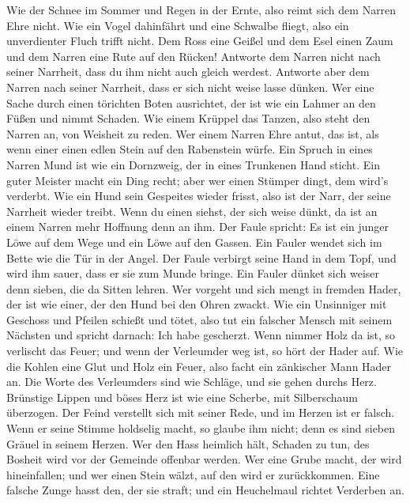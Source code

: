  Wie der Schnee im Sommer und Regen in der Ernte, also
reimt sich dem Narren Ehre nicht.  Wie ein Vogel
dahinfährt und eine Schwalbe fliegt, also ein unverdienter Fluch trifft
nicht.  Dem Ross eine Geißel und dem Esel einen Zaum und
dem Narren eine Rute auf den Rücken!  Antworte dem Narren
nicht nach seiner Narrheit, dass du ihm nicht auch gleich werdest.
 Antworte aber dem Narren nach seiner Narrheit, dass er
sich nicht weise lasse dünken.  Wer eine Sache durch einen
törichten Boten ausrichtet, der ist wie ein Lahmer an den Füßen und
nimmt Schaden.  Wie einem Krüppel das Tanzen, also steht
den Narren an, von Weisheit zu reden.  Wer einem Narren
Ehre antut, das ist, als wenn einer einen edlen Stein auf den Rabenstein
würfe.  Ein Spruch in eines Narren Mund ist wie ein
Dornzweig, der in eines Trunkenen Hand sticht.  Ein guter
Meister macht ein Ding recht; aber wer einen Stümper dingt, dem wird's
verderbt.  Wie ein Hund sein Gespeites wieder frisst,
also ist der Narr, der seine Narrheit wieder treibt. 
Wenn du einen siehst, der sich weise dünkt, da ist an einem Narren mehr
Hoffnung denn an ihm.  Der Faule spricht: Es ist ein
junger Löwe auf dem Wege und ein Löwe auf den Gassen. 
Ein Fauler wendet sich im Bette wie die Tür in der Angel.
 Der Faule verbirgt seine Hand in dem Topf, und wird ihm
sauer, dass er sie zum Munde bringe.  Ein Fauler dünket
sich weiser denn sieben, die da Sitten lehren.  Wer
vorgeht und sich mengt in fremden Hader, der ist wie einer, der den Hund
bei den Ohren zwackt.  Wie ein Unsinniger mit Geschoss
und Pfeilen schießt und tötet,  also tut ein falscher
Mensch mit seinem Nächsten und spricht darnach: Ich habe gescherzt.
 Wenn nimmer Holz da ist, so verlischt das Feuer; und
wenn der Verleumder weg ist, so hört der Hader auf.  Wie
die Kohlen eine Glut und Holz ein Feuer, also facht ein zänkischer Mann
Hader an.  Die Worte des Verleumders sind wie Schläge,
und sie gehen durchs Herz.  Brünstige Lippen und böses
Herz ist wie eine Scherbe, mit Silberschaum überzogen. 
Der Feind verstellt sich mit seiner Rede, und im Herzen ist er falsch.
 Wenn er seine Stimme holdselig macht, so glaube ihm
nicht; denn es sind sieben Gräuel in seinem Herzen.  Wer
den Hass heimlich hält, Schaden zu tun, des Bosheit wird vor der
Gemeinde offenbar werden.  Wer eine Grube macht, der wird
hineinfallen; und wer einen Stein wälzt, auf den wird er zurückkommen.
 Eine falsche Zunge hasst den, der sie straft; und ein
Heuchelmaul richtet Verderben an.

